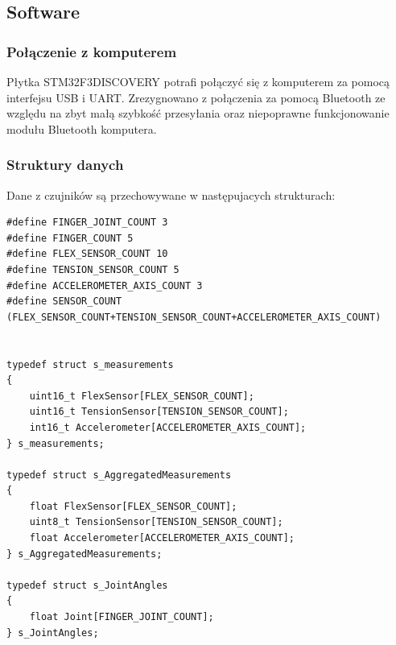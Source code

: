 \documentclass[12pt,a4paper]{article}
\begin{document}
\subsection{Software}
\subsubsection{Połączenie z komputerem}
Płytka STM32F3DISCOVERY potrafi połączyć się z komputerem za pomocą interfejsu USB i UART. Zrezygnowano z połączenia za pomocą Bluetooth ze względu na zbyt małą szybkość przesyłania oraz niepoprawne funkcjonowanie modułu Bluetooth komputera.
\subsubsection{Struktury danych}
Dane z czujników są przechowywane w następujacych strukturach:
\begin{lstlisting}[frame=single]
#define FINGER_JOINT_COUNT 3
#define FINGER_COUNT 5
#define FLEX_SENSOR_COUNT 10
#define TENSION_SENSOR_COUNT 5
#define ACCELEROMETER_AXIS_COUNT 3
#define SENSOR_COUNT (FLEX_SENSOR_COUNT+TENSION_SENSOR_COUNT+ACCELEROMETER_AXIS_COUNT)


typedef struct s_measurements
{
	uint16_t FlexSensor[FLEX_SENSOR_COUNT];
	uint16_t TensionSensor[TENSION_SENSOR_COUNT];
	int16_t Accelerometer[ACCELEROMETER_AXIS_COUNT];
} s_measurements;

typedef struct s_AggregatedMeasurements
{
	float FlexSensor[FLEX_SENSOR_COUNT];
	uint8_t TensionSensor[TENSION_SENSOR_COUNT];
	float Accelerometer[ACCELEROMETER_AXIS_COUNT];
} s_AggregatedMeasurements;

typedef struct s_JointAngles
{
	float Joint[FINGER_JOINT_COUNT];
} s_JointAngles;
\end{lstlisting}
\end{document}
